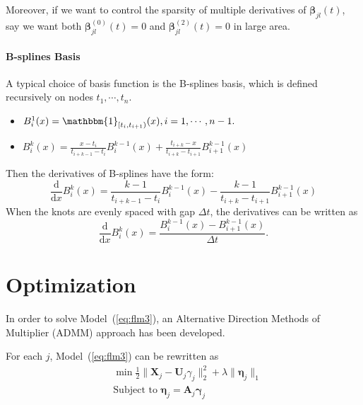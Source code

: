 \documentclass[11pt]{article}
\newcommand{\bX}{\mathbf X}
\newcommand{\bA}{\mathbf A}
\newcommand{\bU}{\mathbf U}
\newcommand{\bbeta}{{\boldsymbol{\beta}}}
\newcommand{\bdeta}{{\boldsymbol{\eta}}}
\newcommand{\bgamma}{\boldsymbol{\gamma}}
\newcommand{\ind}{{\mathbbm{1}}}
\begin{document}
Moreover, if we want to control the sparsity of multiple derivatives of $\bbeta_{jl}(t)$, say we want both $\bbeta_{jl}^{(0)}(t) = 0$ and $\bbeta_{jl}^{(2)}(t) = 0$ in large area.

\paragraph{B-splines Basis}
A typical choice of basis function is the B-splines basis, which is defined recursively on nodes $t_1, \cdots, t_n$.
\begin{itemize}
	\item $B_i^1(x) = \ind_{[t_i, t_{i+1})}(x), i = 1, \cdots, n-1. $
	\item $B_i^k(x) = \frac{x - t_i}{t_{i+k-1} - t_i} B_i^{k-1}(x) + \frac{t_{i+k} - x}{t_{i+k} - t_{i+1}} B_{i + 1}^{k-1}(x)$ 
\end{itemize}
Then the derivatives of B-splines have the form:
$$\frac{\mathrm{d}}{\mathrm{d}x} B_i^k(x) = \frac{k-1}{t_{i+k-1} - t_i}B_i^{k-1}(x) - \frac{k-1}{t_{i+k} - t_{i+1}}B_{i+1}^{k-1}(x)$$
When the knots are evenly spaced with gap $\Delta t$, the derivatives can be written as
$$ \frac{\mathrm{d}}{\mathrm{d}x} B_i^k(x) = \frac{B_i^{k-1}(x) - B_{i+1}^{k-1}(x)}{\Delta t }. $$

\section{Optimization}

In order to solve Model~(\ref{eq:flm3}), an Alternative Direction Methods of Multiplier (ADMM) approach has been developed. 

For each $j$, Model~(\ref{eq:flm3}) can be rewritten as
\begin{equation}
	\label{eq:genlasso}
	\begin{aligned}
	&\min \frac{1}{2} \|\bX_j - \bU_j \gamma_j \|_2^2 + \lambda \|\bdeta_j \|_1 \\
	&\text{Subject to } \bdeta_j = \bA_j \bgamma_j\\
	\end{aligned}	
\end{equation} 
\end{document}
